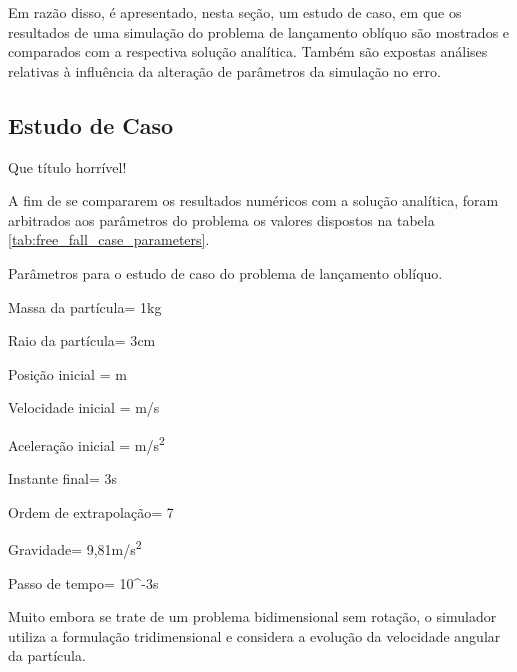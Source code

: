 Em razão disso, é apresentado, nesta seção, um \alert{estudo de caso}, em que os resultados de uma simulação do problema de lançamento oblíquo são mostrados e comparados com a respectiva solução analítica. Também são expostas análises relativas à influência da alteração de parâmetros da simulação no erro.

\subsection{\alert{Estudo de Caso}} \alert{Que título horrível!}

A fim de se compararem os resultados numéricos com a solução analítica, foram arbitrados aos parâmetros do problema os valores dispostos na tabela \ref{tab:free_fall_case_parameters}.

\begin{table}[h]
\centering
\caption{Parâmetros para o \alert{estudo de caso} do problema de lançamento oblíquo.}
\label{tab:free_fall_case_parameters}
\begin{parametersdesc}
	\item{Massa da partícula}{\mass = 1}{\si\kilogram}
	\item{Raio da partícula}{\radius = 3}{\si\centi\metre}
	\item{Posição inicial}{\explicitVector{\initial{\positionx}}{\initial{\positiony}}{\initial{\positionz}} = }{\si{\metre}}
	\item{Velocidade inicial}{\explicitVector{\initial{\velocityx}}{\initial{\velocityy}}{\initial{\velocityz}} = }{\si[per-mode=symbol]{\metre\per\second}}
	\item{Aceleração inicial}{\explicitVector{\initial{\accelerationx}}{\initial{\accelerationy}}{\initial{\accelerationz}} = }{\si[per-mode=symbol]{\metre\per\square\second}}
	\item{Instante final}{\finalInstant = 3}{\si\second} 
	\item{Ordem de extrapolação}{\taylorOrder = 7}{\emptyTableEntry}
	\item{Gravidade}{\gravityScalar = 9,81}{\si[per-mode=symbol]{\metre\per\square\second}}
	\item{Passo de tempo}{\Dt = 10^{-3}}{\si\second}
\end{parametersdesc}
\sourceMe 
\end{table}

Muito embora se trate de um problema bidimensional sem rotação, o simulador utiliza a formulação tridimensional e considera a evolução da velocidade angular da partícula.

